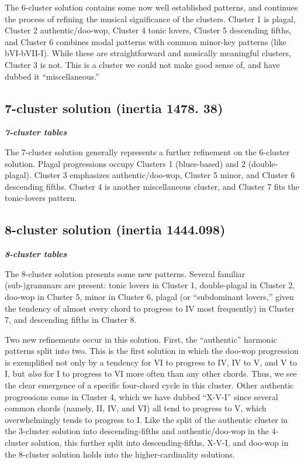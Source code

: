 The 6-cluster solution contains some now well established patterns, and continues the process of refining the musical significance of the clusters. Cluster 1 is plagal, Cluster 2 authentic\slash doo-wop, Cluster 4 tonic lovers, Cluster 5 descending fifths, and Cluster 6 combines modal patterns with common minor-key patterns (like bVI-bVII-I). While these are straightforward and musically meaningful clusters, Cluster 3 is not. This is a cluster we could not make good sense of, and have dubbed it ``miscellaneous.''

\subsection{7-cluster solution (inertia 1478. 38)}
\label{7-clustersolutioninertia1478.38}

\textbf{\emph{7-cluster tables}}

The 7-cluster solution generally represents a further refinement on the 6-cluster solution. Plagal progressions occupy Clusters 1 (blues-based) and 2 (double-plagal). Cluster 3 emphasizes authentic\slash doo-wop, Cluster 5 minor, and Cluster 6 descending fifths. Cluster 4 is another miscellaneous cluster, and Cluster 7 fits the tonic-lovers pattern.

\subsection{8-cluster solution (inertia 1444.098)}
\label{8-clustersolutioninertia1444.098}

\textbf{\emph{8-cluster tables}}

The 8-cluster solution presents some new patterns. Several familiar (sub-)grammars are present: tonic lovers in Cluster 1, double-plagal in Cluster 2, doo-wop in Cluster 5, minor in Cluster 6, plagal (or ``subdominant lovers,'' given the tendency of almost every chord to progress to IV most frequently) in Cluster 7, and descending fifths in Cluster 8.

Two new refinements occur in this solution. First, the ``authentic'' harmonic patterns split into two. This is the first solution in which the doo-wop progression is exemplified not only by a tendency for VI to progress to IV, IV to V, and V to I, but \emph{also} for I to progress to VI more often than any other chords. Thus, we see the clear emergence of a specific four-chord cycle in this cluster. Other authentic progressions come in Cluster 4, which we have dubbed ``X-V-I'' since several common chords (namely, II, IV, and VI) all tend to progress to V, which overwhelmingly tends to progress to I. Like the split of the authentic cluster in the 3-cluster solution into descending-fifths and authentic\slash doo-wop in the 4-cluster solution, this further split into descending-fifths, X-V-I, and doo-wop in the 8-cluster solution holds into the higher-cardinality solutions.

